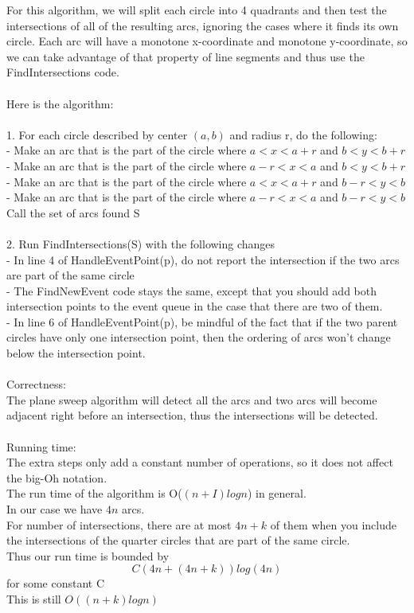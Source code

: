 \documentclass[11pt,psfig]{article}
\begin{document}
For this algorithm, we will split each circle into 4 quadrants and then test the intersections of all of the resulting arcs, ignoring the cases where it finds its own circle. Each arc will have a monotone x-coordinate and monotone y-coordinate, so we can take advantage of that property of line segments and thus use the FindIntersections code. \\
\\
Here is the algorithm:\\
\\
1. For each circle described by center $(a,b)$ and radius r, do the following:\\
- Make an arc that is the part of the circle where $a < x < a+r$ and $b < y < b+r$\\
- Make an arc that is the part of the circle where $a-r < x < a$ and $b < y < b+r$\\
- Make an arc that is the part of the circle where $a < x < a+r$ and $b-r < y < b$\\
- Make an arc that is the part of the circle where $a-r < x < a$ and $b-r < y < b$\\
Call the set of arcs found S\\
\\
2. Run FindIntersections(S) with the following changes\\
- In line 4 of HandleEventPoint(p), do not report the intersection if the two arcs are part of the same circle\\
- The FindNewEvent code stays the same, except that you should add both intersection points to the event queue in the case that there are two of them. \\
- In line 6 of HandleEventPoint(p), be mindful of the fact that if the two parent circles have only one intersection point, then the ordering of arcs won't change below the intersection point. \\
\\
Correctness:\\
The plane sweep algorithm will detect all the arcs and two arcs will become adjacent right before an intersection, thus the intersections will be detected. \\
\\
Running time:\\
The extra steps only add a constant number of operations, so it does not affect the big-Oh notation. \\
The run time of the algorithm is O($(n+I)logn$) in general.\\
In our case we have $4n$ arcs. \\
For number of intersections, there are at most $4n + k$ of them when you include the intersections of the quarter circles that are part of the same circle. \\
Thus our run time is bounded by 
\[
C(4n + (4n+k) )log(4n)
\]
for some constant C\\
This is still $O((n+k)logn)$
\end{document}

